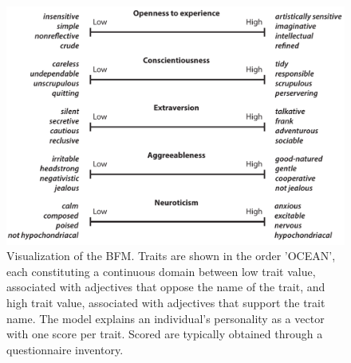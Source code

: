 \begin{figure}[h!]
\centering
\includegraphics[width=\linewidth]{figures/bigfive}
\caption{\label{fig:bigfive}Visualization of the BFM. Traits are shown in the order 'OCEAN', each constituting a continuous domain between low trait value, associated with adjectives that oppose the name of the trait, and high trait value, associated with adjectives that support the trait name. The model explains an individual's personality as a vector with one score per trait. Scored are typically obtained through a questionnaire inventory.}
\end{figure}

